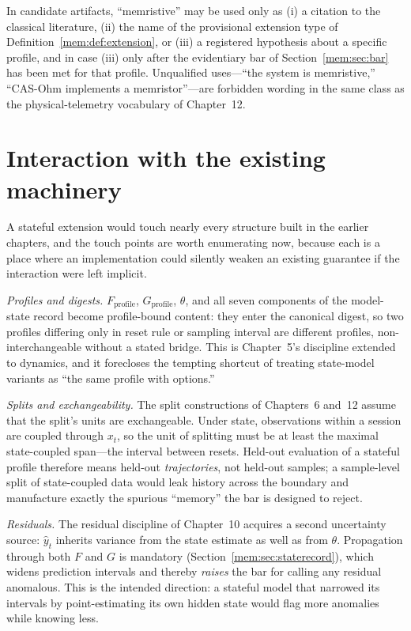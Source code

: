\begin{ruleenv}\label{mem:rule:vocab}
In candidate artifacts, ``memristive'' may be used only as (i) a citation to the classical literature, (ii) the name of the provisional extension type of Definition~\ref{mem:def:extension}, or (iii) a registered hypothesis about a specific profile, and in case (iii) only after the evidentiary bar of Section~\ref{mem:sec:bar} has been met for that profile. Unqualified uses---``the system is memristive,'' ``CAS-Ohm implements a memristor''---are forbidden wording in the same class as the physical-telemetry vocabulary of Chapter~12.
\end{ruleenv}

\section{Interaction with the existing machinery}\label{mem:sec:interaction}

A stateful extension would touch nearly every structure built in the earlier chapters, and the touch points are worth enumerating now, because each is a place where an implementation could silently weaken an existing guarantee if the interaction were left implicit.

\emph{Profiles and digests.} $F_{\mathrm{profile}}$, $G_{\mathrm{profile}}$, $\theta$, and all seven components of the model-state record become profile-bound content: they enter the canonical digest, so two profiles differing only in reset rule or sampling interval are different profiles, non-interchangeable without a stated bridge. This is Chapter~5's discipline extended to dynamics, and it forecloses the tempting shortcut of treating state-model variants as ``the same profile with options.''

\emph{Splits and exchangeability.} The split constructions of Chapters~6 and~12 assume that the split's units are exchangeable. Under state, observations within a session are coupled through $x_t$, so the unit of splitting must be at least the maximal state-coupled span---the interval between resets. Held-out evaluation of a stateful profile therefore means held-out \emph{trajectories}, not held-out samples; a sample-level split of state-coupled data would leak history across the boundary and manufacture exactly the spurious ``memory'' the bar is designed to reject.

\emph{Residuals.} The residual discipline of Chapter~10 acquires a second uncertainty source: $\hat y_t$ inherits variance from the state estimate as well as from $\theta$. Propagation through both $F$ and $G$ is mandatory (Section~\ref{mem:sec:staterecord}), which widens prediction intervals and thereby \emph{raises} the bar for calling any residual anomalous. This is the intended direction: a stateful model that narrowed its intervals by point-estimating its own hidden state would flag more anomalies while knowing less.

